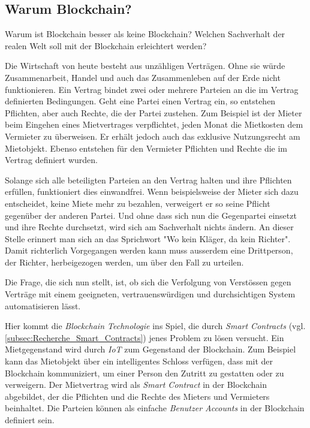 \subsection{Warum Blockchain?}
Warum ist Blockchain besser als keine Blockchain? Welchen Sachverhalt der realen Welt soll mit der Blockchain erleichtert werden?

Die Wirtschaft von heute besteht aus unzähligen Verträgen. Ohne sie würde Zusammenarbeit, Handel und auch das Zusammenleben auf der Erde nicht funktionieren. Ein Vertrag bindet zwei oder mehrere Parteien an die im Vertrag definierten Bedingungen. Geht eine Partei einen Vertrag ein, so entstehen Pflichten, aber auch Rechte, die der Partei zustehen. Zum Beispiel ist der Mieter beim Eingehen eines Mietvertrages verpflichtet, jeden Monat die Mietkosten dem Vermieter zu überweisen. Er erhält jedoch auch das exklusive Nutzungsrecht am Mietobjekt. Ebenso entstehen für den Vermieter Pflichten und Rechte die im Vertrag definiert wurden.

Solange sich alle beteiligten Parteien an den Vertrag halten und ihre Pflichten erfüllen, funktioniert dies einwandfrei. Wenn beispielsweise der Mieter sich dazu entscheidet, keine Miete mehr zu bezahlen, verweigert er so seine Pflicht gegenüber der anderen Partei. Und ohne dass sich nun die Gegenpartei einsetzt und ihre Rechte durchsetzt, wird sich am Sachverhalt nichts ändern. An dieser Stelle erinnert man sich an das Sprichwort "Wo kein Kläger, da kein Richter". Damit richterlich Vorgegangen werden kann muss ausserdem eine Drittperson, der Richter, herbeigezogen werden, um über den Fall zu urteilen.

Die Frage, die sich nun stellt, ist, ob sich die Verfolgung von Verstössen gegen Verträge mit einem geeigneten, vertrauenswürdigen und durchsichtigen System automatisieren lässt.

Hier kommt die \emph{Blockchain Technologie} ins Spiel, die durch \emph{Smart Contracts} (vgl. \ref{subsec:Recherche_Smart_Contracts}) jenes Problem zu lösen versucht. Ein Mietgegenstand wird durch \emph{IoT} zum Gegenstand der Blockchain. Zum Beispiel kann das Mietobjekt über ein intelligentes Schloss verfügen, dass mit der Blockchain kommuniziert, um einer Person den Zutritt zu gestatten oder zu verweigern. Der Mietvertrag wird als \emph{Smart Contract} in der Blockchain abgebildet, der die Pflichten und die Rechte des Mieters und Vermieters beinhaltet. Die Parteien können als einfache \emph{Benutzer Accounts} in der Blockchain definiert sein.


